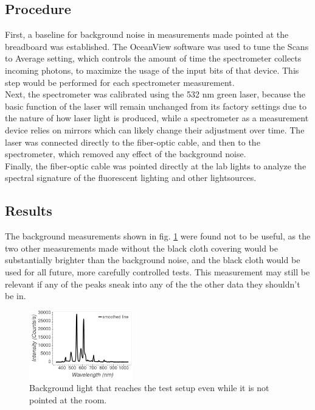 \documentclass[aps,prl,reprint]{revtex4-2}
\begin{document}
\subsection{Procedure}

First, a baseline for background noise in measurements made pointed at the breadboard
was established. The OceanView software was used to tune the Scans to Average setting,
which controls the amount of time the spectrometer collects incoming photons,
to maximize the usage of the input bits of that device. This step would be performed
for each spectrometer measurement. \\

Next, the spectrometer was calibrated using the 532 nm green laser, because the
basic function of the laser will remain unchanged from its factory settings due to
the nature of how laser light is produced, while a spectrometer as a measurement
device relies on mirrors which can likely change their adjustment over time. The laser
was connected directly to the fiber-optic cable, and then to the spectrometer, which
removed any effect of the background noise.\\

Finally, the fiber-optic cable was pointed directly at the lab lights to analyze the 
spectral signature of the fluorescent lighting and other lightsources.\\

\subsection{Results}


The background measurements shown in fig. \ref{bkg} were found not to be useful, as 
the two other measurements made without the black cloth covering would be 
substantially brighter than the background noise, and the black cloth would be used 
for all future, more carefully controlled tests. This measurement may still be
relevant if any of the peaks sneak into any of the the other data they shouldn't be 
in.\\

\begin{figure}[h]
	\includegraphics[width=0.4\textwidth]{../Images/l3_A_bkg.png}
	\caption{\label{bkg} Background light that reaches the test setup
	even while it is not pointed at the room.}
\end{figure}
\end{document}
